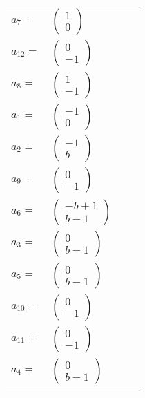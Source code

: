 \documentclass[1p]{elsarticle_modified}
\theoremstyle{definition}
\begin{document}
\begin{tabular}{m{7pt} m{180pt} m{7pt} m{180pt} }
\flushright $a_{7}=$&$\begin{pmatrix}1\\0\end{pmatrix}$ \\
\flushright $a_{12}=$&$\begin{pmatrix}0\\-1\end{pmatrix}$ \\
\flushright $a_{8}=$&$\begin{pmatrix}1\\-1\end{pmatrix}$ \\
\flushright $a_{1}=$&$\begin{pmatrix}-1\\0\end{pmatrix}$ \\
\flushright $a_{2}=$&$\begin{pmatrix}-1\\b\end{pmatrix}$ \\
\flushright $a_{9}=$&$\begin{pmatrix}0\\-1\end{pmatrix}$ \\
\flushright $a_{6}=$&$\begin{pmatrix}- b+1\\b-1\end{pmatrix}$ \\
\flushright $a_{3}=$&$\begin{pmatrix}0\\b-1\end{pmatrix}$ \\
\flushright $a_{5}=$&$\begin{pmatrix}0\\b-1\end{pmatrix}$ \\
\flushright $a_{10}=$&$\begin{pmatrix}0\\-1\end{pmatrix}$ \\
\flushright $a_{11}=$&$\begin{pmatrix}0\\-1\end{pmatrix}$ \\
\flushright $a_{4}=$&$\begin{pmatrix}0\\b-1\end{pmatrix}$\\&\end{tabular}
\end{document}
